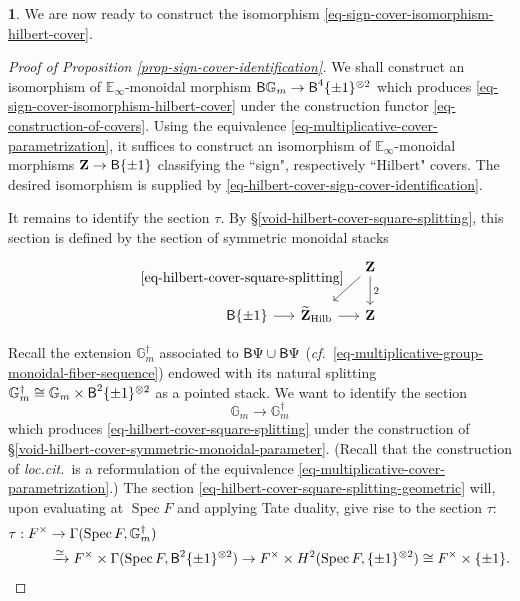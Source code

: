 \documentclass[10pt,english,reqno]{amsart}
\newcommand{\integers}{\mathbf Z}
\newcommand{\deloop}{\textnormal{\textsf{B}}}
\newcommand{\Spec}{\operatorname{Spec}}
\newcommand{\Hilbert}{\mathrm{Hilb}}
\theoremstyle{definition}
\numberwithin{equation}{section}
\newtheorem{untitledsubsubsection}[subsubsection]{}
\newenvironment{void}
{\begin{untitledsubsubsection}}
{\end{untitledsubsubsection}}
\begin{document}

\begin{void}
We are now ready to construct the isomorphism \eqref{eq-sign-cover-isomorphism-hilbert-cover}.

\begin{proof}[Proof of Proposition \ref{prop-sign-cover-identification}]
We shall construct an isomorphism of $\mathbb E_{\infty}$-monoidal morphism $\deloop \mathbb G_m \rightarrow \deloop^4\{\pm 1\}^{\otimes 2}$ which produces \eqref{eq-sign-cover-isomorphism-hilbert-cover} under the construction functor \eqref{eq-construction-of-covers}. Using the equivalence \eqref{eq-multiplicative-cover-parametrization}, it suffices to construct an isomorphism of $\mathbb E_{\infty}$-monoidal morphisms $\integers \rightarrow \deloop\{\pm 1\}$ classifying the ``sign", respectively ``Hilbert" covers. The desired isomorphism is supplied by \eqref{eq-hilbert-cover-sign-cover-identification}.

It remains to identify the section $\tau$. By \S\ref{void-hilbert-cover-square-splitting}, this section is defined by the section of symmetric monoidal stacks
$$
\begin{tikzcd}[column sep = 1.5em]
	& & \integers \ar[d, "2"]\ar[dl, swap, "\eqref{eq-hilbert-cover-square-splitting}"] \\ 
	\deloop\{\pm 1\} \ar[r] & \widetilde{\integers}_{\Hilbert} \ar[r] & \integers
\end{tikzcd}
$$

Recall the extension $\mathbb G_m^{\dagger}$ associated to $\deloop\Psi\cup\deloop\Psi$ (\emph{cf.}~\eqref{eq-multiplicative-group-monoidal-fiber-sequence}) endowed with its natural splitting $\mathbb G_m^{\dagger} \cong \mathbb G_m \times \deloop^2\{\pm 1\}^{\otimes 2}$ as a pointed stack. We want to identify the section
\begin{equation}
\label{eq-hilbert-cover-square-splitting-geometric}
\mathbb G_m \rightarrow \mathbb G_m^{\dagger}
\end{equation}
which produces \eqref{eq-hilbert-cover-square-splitting} under the construction of \S\ref{void-hilbert-cover-symmetric-monoidal-parameter}. (Recall that the construction of \emph{loc.cit.}~is a reformulation of the equivalence \eqref{eq-multiplicative-cover-parametrization}.) The section \eqref{eq-hilbert-cover-square-splitting-geometric} will, upon evaluating at $\Spec F$ and applying Tate duality, give rise to the section $\tau$:
\begin{align*}
\tau : F^{\times} &\rightarrow \Gamma(\Spec F, \mathbb G_m^{\dagger}) \\
& \xrightarrow{\simeq} F^{\times} \times \Gamma(\Spec F, \deloop^2\{\pm 1\}^{\otimes 2}) \rightarrow F^{\times} \times H^2(\Spec F, \{\pm 1\}^{\otimes 2}) \cong F^{\times }\times \{\pm 1\}.
\end{align*}


\end{proof}
\end{void}
\end{document}
